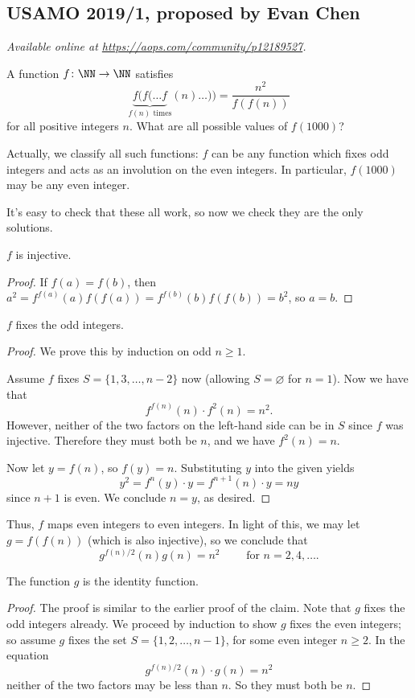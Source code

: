 \documentclass[11pt]{scrartcl}
\begin{document}
\subsection{USAMO 2019/1, proposed by Evan Chen}
\textsl{Available online at \url{https://aops.com/community/p12189527}.}
\begin{mdframed}[style=mdpurplebox,frametitle={Problem statement}]
A function $f \colon \NN \to \NN$ satisfies
\[ \underbrace{f(f(\dots f}_{f(n)\text{ times}} (n)\dots)) %
  = \frac{n^2}{f(f(n))} \]
for all positive integers $n$.
What are all possible values of $f(1000)$?
\end{mdframed}
Actually, we classify all such functions:
$f$ can be any function which fixes odd integers
and acts as an involution on the even integers.
In particular, $f(1000)$ may be any even integer.

It's easy to check that these all work,
so now we check they are the only solutions.

\begin{claim*}
  $f$ is injective.
\end{claim*}
\begin{proof}
  If $f(a) = f(b)$,
  then $a^2 = f^{f(a)}(a) f(f(a)) = f^{f(b)}(b) f(f(b)) = b^2$,
  so $a = b$.
\end{proof}

\begin{claim*}
  $f$ fixes the odd integers.
\end{claim*}
\begin{proof}
  We prove this by induction on odd $n \ge 1$.

  Assume $f$ fixes $S = \{1,3,\dots,n-2\}$ now
  (allowing $S = \varnothing$ for $n=1$).
  Now we have that
  \[ f^{f(n)}(n) \cdot f^2(n) = n^2. \]
  However, neither of the two factors on the left-hand
  side can be in $S$ since $f$ was injective.
  Therefore they must both be $n$,
  and we have $f^2(n) = n$.

  Now let $y = f(n)$, so $f(y) = n$.
  Substituting $y$ into the given yields
  \[ y^2 = f^n(y) \cdot y =
    f^{n+1}(n) \cdot y = ny \]
  since $n+1$ is even.
  We conclude $n=y$, as desired.
\end{proof}

Thus, $f$ maps even integers to even integers.
In light of this, we may let $g = f(f(n))$
(which is also injective),
so we conclude that
\[ g^{f(n)/2} (n) g(n) = n^2 \qquad \text{ for } n = 2, 4, \dots. \]
\begin{claim*}
  The function $g$ is the identity function.
\end{claim*}
\begin{proof}
  The proof is similar to the earlier proof of the claim.
  Note that $g$ fixes the odd integers already.
  We proceed by induction to show $g$ fixes the even integers;
  so assume $g$ fixes the set $S = \{1, 2, \dots, n-1\}$,
  for some even integer $n \ge 2$.
  In the equation
  \[ g^{f(n)/2}(n) \cdot g(n) = n^2 \]
  neither of the two factors may be less than $n$.
  So they must both be $n$.
\end{proof}
\end{document}
